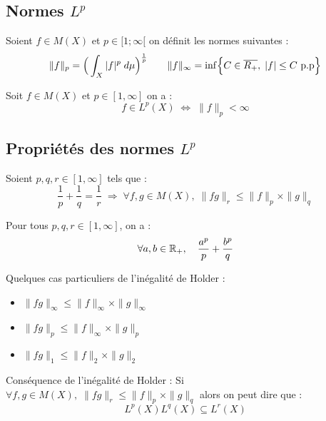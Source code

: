 \subsection{Normes $L^p$}

\begin{definition}[Normes $L^p$]
    Soient $f \in M(X)$ et $p \in [1;\infty[$ on définit les normes suivantes :
    \[ 
        \|f\|_p = \Big( \int_X |f|^p \; d \mu \Big)^{\frac{1}{p}} \qquad 
        \|f\|_\infty  = \inf \Bigl\{ C \in \overline{R_+}, \; |f| \leq C \text{ p.p} \Bigr\}
    \]
\end{definition}

\begin{prop}
    Soit $f \in M(X)$ et $p \in [1,\infty]$ on a :
        \[ f \in L^p(X) \; \Longleftrightarrow \; \|f\|_p < \infty \]
\end{prop}

\subsection{Propriétés des normes $L^p$}

\begin{theorem}
    Soient $p,q,r \in [1,\infty]$ tels que :
        \[ \boxed{ \frac{1}{p} + \frac{1}{q} = \frac{1}{r} \; \Longrightarrow \; \forall f,g \in M(X), \; \|fg\|_r \leq \|f\|_p \times \|g\|_q } \] 
\end{theorem}

\begin{theorem}
    Pour tous $p,q,r \in [1,\infty]$, on a :
        \[ \forall a,b \in \mathbb{R}_+, \quad \frac{a^p}{p} + \frac{b^p}{q} \] 
\end{theorem}

\begin{remark} 
    Quelques cas particuliers de l'inégalité de Holder :
    
    \begin{itemize}
        \item $ \|fg\|_\infty \leq \| f \|_\infty \times \|g\|_\infty $
        \item $ \|fg\|_p \leq \|f\|_\infty \times \|g\|_p $
        \item $ \|fg\|_1 \leq \|f\|_2 \times \|g\|_2 $
    \end{itemize}
\end{remark}

\begin{remark} Conséquence de l'inégalité de Holder :
    Si $ \forall f,g \in M(X), \; \|fg\|_r \leq \|f\|_p \times \|g\|_q$ alors on peut dire que :
        \[ L^p(X) L^q(X) \subseteq L^r(X) \] 
\end{remark}

